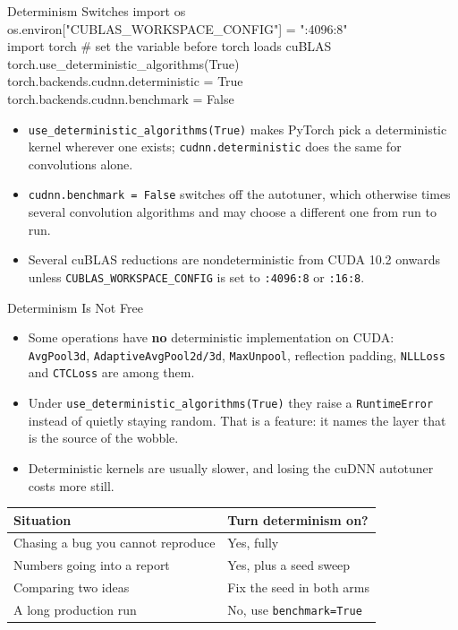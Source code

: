 \begin{frame}{Determinism Switches}
    \ttfamily\footnotesize{
    import os \\
    os.environ["CUBLAS\_WORKSPACE\_CONFIG"] = ":4096:8" \\
    import torch \# set the variable before torch loads cuBLAS \\

    torch.use\_deterministic\_algorithms(True) \\
    torch.backends.cudnn.deterministic = True \\
    torch.backends.cudnn.benchmark = False
    }
\vspace{1em}
\begin{itemize}
    \item \texttt{use\_deterministic\_algorithms(True)} makes PyTorch pick a deterministic kernel wherever one exists; \texttt{cudnn.deterministic} does the same for convolutions alone.
    \item \texttt{cudnn.benchmark = False} switches off the autotuner, which otherwise times several convolution algorithms and may choose a different one from run to run.
    \item Several cuBLAS reductions are nondeterministic from CUDA 10.2 onwards unless \texttt{CUBLAS\_WORKSPACE\_CONFIG} is set to \texttt{:4096:8} or \texttt{:16:8}.
\end{itemize}
\end{frame}

\begin{frame}{Determinism Is Not Free}
\begin{itemize}
    \item Some operations have \textbf{no} deterministic implementation on CUDA: \texttt{AvgPool3d}, \texttt{AdaptiveAvgPool2d/3d}, \texttt{MaxUnpool}, reflection padding, \texttt{NLLLoss} and \texttt{CTCLoss} are among them.
    \item Under \texttt{use\_deterministic\_algorithms(True)} they raise a \texttt{RuntimeError} instead of quietly staying random. That is a feature: it names the layer that is the source of the wobble.
    \item Deterministic kernels are usually slower, and losing the cuDNN autotuner costs more still.
\end{itemize}
\vspace{0.5em}
\begin{center}
\small
\begin{tabular}{|l|l|}
    \hline
    \textbf{Situation} & \textbf{Turn determinism on?} \\
    \hline
    Chasing a bug you cannot reproduce & Yes, fully \\
    Numbers going into a report & Yes, plus a seed sweep \\
    Comparing two ideas & Fix the seed in both arms \\
    A long production run & No, use \texttt{benchmark=True} \\
    \hline
\end{tabular}
\end{center}
\end{frame}


